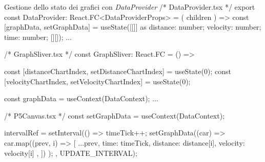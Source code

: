 \begin{tsCode}{Gestione dello stato dei grafici con \textit{DataProvider}}
/* DataProvider.tsx */
export const DataProvider: React.FC<DataProviderProps> = ({ children }) => {
  const [graphData, setGraphData] = useState([[]] as {
    distance: number;
    velocity: number;
    time: number;
  }[][]);
  ...
}

/* GraphSliver.tsx */
const GraphSliver: React.FC = () => {
  const [distanceChartIndex, setDistanceChartIndex] = useState(0);
  const [velocityChartIndex, setVelocityChartIndex] = useState(0);

  const { graphData } = useContext(DataContext);
  ...
}

/* P5Canvas.tsx */
const { setGraphData } = useContext(DataContext);

intervalRef = setInterval(() => {
  timeTick++;
  setGraphData((car) => 
    car.map((prev, i) => [ 
      ...prev, 
      { time: timeTick, distance: distance[i], velocity: velocity[i] },
    ])
  );
}, UPDATE_INTERVAL);
\end{tsCode}
